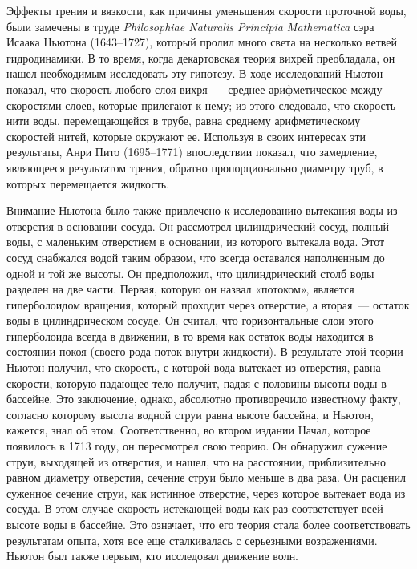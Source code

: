 Эффекты трения и вязкости, как причины уменьшения скорости проточной воды, были 
замечены в труде \textit{Philosophiae Naturalis Principia Mathematica} сэра Исаака Ньютона 
(1643--1727), который пролил много света на несколько ветвей гидродинамики. 
В то время, когда декартовская теория вихрей преобладала, он нашел необходимым 
исследовать эту гипотезу. В ходе исследований Ньютон показал, что скорость 
любого слоя вихря~--- среднее арифметическое между скоростями слоев, которые 
прилегают к нему; из этого следовало, что скорость нити воды, перемещающейся в трубе, 
равна среднему арифметическому скоростей нитей, которые окружают ее. Используя в своих 
интересах эти результаты, Анри Пито (1695--1771) впоследствии показал, что замедление, 
являющееся результатом трения, обратно пропорционально диаметру труб, в которых 
перемещается жидкость.

Внимание Ньютона было также привлечено к исследованию вытекания воды из отверстия в основании 
сосуда. Он рассмотрел цилиндрический сосуд, полный воды, с маленьким отверстием в основании, 
из которого вытекала вода. Этот сосуд снабжался водой таким образом, что всегда оставался 
наполненным до одной и той же высоты. Он предположил, что цилиндрический столб воды разделен 
на две части. Первая, которую он назвал «потоком», является гиперболоидом вращения, который 
проходит через отверстие, а вторая~--- остаток воды в цилиндрическом сосуде. Он считал, что 
горизонтальные слои этого гиперболоида всегда в движении, в то время как остаток воды 
находится в состоянии покоя (своего рода поток внутри жидкости). В результате этой теории 
Ньютон получил, что скорость, с которой вода вытекает из отверстия, равна скорости, 
которую падающее тело получит, падая с половины высоты воды в бассейне. Это заключение, 
однако, абсолютно противоречило известному факту, согласно которому высота водной струи 
равна высоте бассейна, и Ньютон, кажется, знал об этом. Соответственно, во втором издании Начал, 
которое появилось в 1713 году, он пересмотрел свою теорию. Он обнаружил сужение струи, 
выходящей из отверстия, и нашел, что на расстоянии, приблизительно равном диаметру отверстия, 
сечение струи было меньше в два раза. Он расценил суженное сечение струи, как истинное отверстие, 
через которое вытекает вода из сосуда. В этом случае скорость истекающей воды как раз 
соответствует всей высоте воды в бассейне. Это означает, что его теория стала более 
соответствовать результатам опыта, хотя все еще сталкивалась с серьезными возражениями. 
Ньютон был также первым, кто исследовал движение волн.

